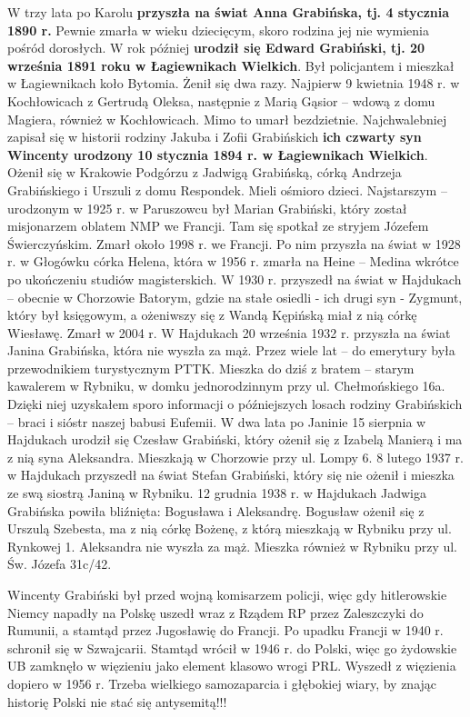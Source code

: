 W trzy lata po Karolu \textbf{przyszła na świat Anna Grabińska, tj. 4 stycznia 1890 r.} Pewnie zmarła w wieku dziecięcym, skoro rodzina jej nie wymienia pośród dorosłych. W rok później \textbf{urodził się Edward Grabiński, tj. 20 września 1891 roku w Łagiewnikach Wielkich}. Był policjantem i mieszkał w Łagiewnikach koło Bytomia. Żenił się dwa razy. Najpierw 9 kwietnia 1948 r. w Kochłowicach z Gertrudą Oleksa, następnie z Marią Gąsior – wdową z domu Magiera, również w Kochłowicach. Mimo to umarł bezdzietnie. 
Najchwalebniej zapisał się w historii rodziny Jakuba i Zofii Grabińskich \textbf{ich czwarty syn Wincenty urodzony 10 stycznia 1894 r. w Łagiewnikach Wielkich}. Ożenił się w Krakowie Podgórzu z Jadwigą Grabińską, córką Andrzeja Grabińskiego i Urszuli z domu Respondek. Mieli ośmioro dzieci. Najstarszym – urodzonym w 1925 r. w Paruszowcu był Marian Grabiński, który został misjonarzem oblatem NMP we Francji. Tam się spotkał ze stryjem Józefem Świerczyńskim. Zmarł około 1998 r. we Francji. Po nim przyszła na świat w 1928 r. w Głogówku córka Helena, która w 1956 r. zmarła na Heine – Medina wkrótce po ukończeniu studiów magisterskich. W 1930 r. przyszedł na świat w Hajdukach – obecnie w Chorzowie Batorym, gdzie na stałe osiedli - ich drugi syn  - Zygmunt, który był księgowym, a ożeniwszy się z Wandą Kępińską miał z nią córkę Wiesławę. Zmarł w 2004 r. W Hajdukach 20 września 1932 r. przyszła na świat Janina Grabińska, która nie wyszła za mąż. Przez wiele lat – do emerytury była przewodnikiem turystycznym PTTK. Mieszka do dziś z bratem – starym kawalerem w Rybniku, w domku jednorodzinnym przy ul. Chełmońskiego 16a. Dzięki niej uzyskałem sporo informacji o późniejszych losach rodziny Grabińskich – braci i sióstr naszej babusi Eufemii. W dwa lata po Janinie 15 sierpnia w Hajdukach urodził się Czesław Grabiński, który ożenił się z Izabelą Manierą i ma z nią syna Aleksandra. Mieszkają w Chorzowie przy ul. Lompy 6. 8 lutego 1937 r. w Hajdukach przyszedł na świat Stefan Grabiński, który się nie ożenił i mieszka ze swą siostrą Janiną w Rybniku. 12 grudnia 1938 r. w Hajdukach Jadwiga Grabińska powiła bliźnięta: Bogusława i Aleksandrę. Bogusław ożenił się z Urszulą Szebesta, ma z nią córkę Bożenę, z którą mieszkają w Rybniku przy ul. Rynkowej 1. Aleksandra nie wyszła za mąż. Mieszka również w Rybniku przy ul. Św. Józefa 31c/42.

Wincenty Grabiński był przed wojną komisarzem policji, więc gdy hitlerowskie Niemcy napadły na Polskę uszedł wraz z Rządem RP przez Zaleszczyki do Rumunii, a stamtąd przez Jugosławię do Francji. Po upadku Francji w 1940 r. schronił się w Szwajcarii. Stamtąd wrócił w 1946 r. do Polski, więc go żydowskie UB zamknęło w więzieniu jako element klasowo wrogi PRL. Wyszedł z więzienia dopiero w 1956 r. Trzeba wielkiego samozaparcia i głębokiej wiary, by znając historię Polski nie stać się antysemitą!!!

